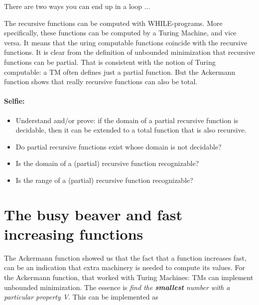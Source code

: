 There are two ways you can end up in a loop ...




The recursive functions can be computed with WHILE-programs. More
specifically, these functions can be computed by a Turing Machine, and
vice versa. It means that the uring computable functions coincide with
the recursive functions. It is clear from the definition of unbounded
minimization that recursive functions can be partial. That is
consistent with the notion of Turing computable: a TM often defines
just a partial function. But the Ackermann function shows that really
recursive functions can also be total.


\paragraph{Selfie:}
\begin{itemize}
\item[]
Understand and/or prove: if the domain of a partial recursive function
is decidable, then it can be extended to a total function that is also
recursive.
\item[]
Do partial recursive functions exist whose domain is not decidable?
\item[]
Is the domain of a (partial) recursive function recognizable?
\item[]
Is the range of a (partial) recursive function recognizable?
\end{itemize}

\clearpage


\section{The busy beaver and fast increasing functions}

The Ackermann function showed us that the fact that a function
increases fast, can be an indication that extra machinery is needed to
compute its values. For the Ackermann function, that worked with
Turing Machines: TMs can implement unbounded minimization. The essence
is {\em find the {\bf smallest} number with a particular property
  V}. This can be implemented as

